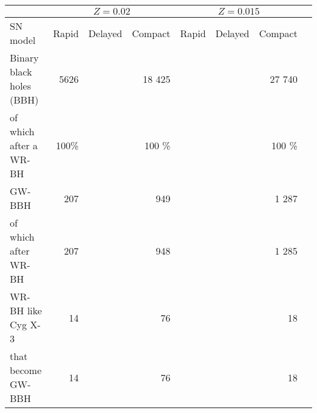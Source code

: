 \documentclass{standalone}
\begin{document}
	\begin{tabular}{lrrrrrrr}
		\toprule
		& \multicolumn{3}{c}{$Z=0.02$} & \multicolumn{3}{c}{$Z=0.015$}  \\
		\midrule
		SN model & Rapid & Delayed & Compact&  Rapid & Delayed & Compact\\
		\midrule
		Binary black holes (BBH)  		& 5626 &  & 18 425 &  &  & 27 740 \\
		of which after a WR-BH			& 100\% &  & 100 \% &  & & 100 \% \\
		\midrule
		GW-BBH  						& 207 &  & 949 &  & & 1 287 \\
		of which after WR-BH			& 207 & & 948 &  &  & 1 285 \\
		\midrule
		WR-BH like Cyg X-3  	 		& 14 & & 76 &  & & 18 \\
		that become GW-BBH   		 	& 14 & & 76 &  &  & 18 \\
		\bottomrule 	
	\end{tabular}
\end{document}
